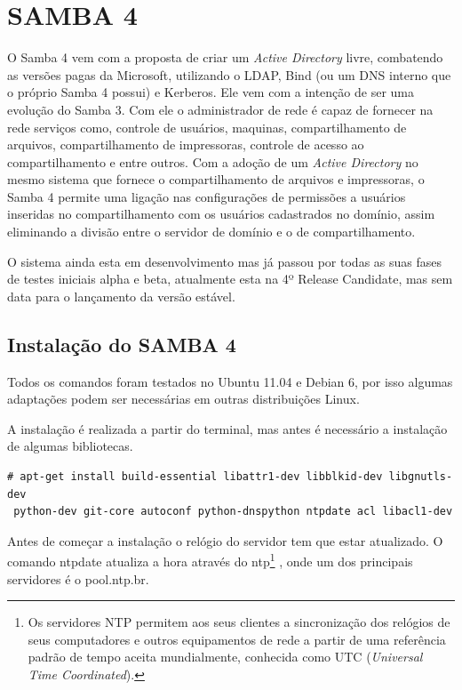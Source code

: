 \chapter{SAMBA 4}

O Samba 4 vem com a proposta de criar um \textit{Active Directory} livre, combatendo as versões pagas da Microsoft, utilizando o LDAP, Bind (ou um DNS interno que o próprio Samba 4 possui) e Kerberos. Ele vem com a intenção de ser uma evolução do Samba 3. Com ele o administrador de rede é capaz de fornecer na rede serviços como, controle de usuários, maquinas, compartilhamento de arquivos, compartilhamento de impressoras, controle de acesso ao compartilhamento e entre outros.
Com a adoção de um \textit{Active Directory} no mesmo sistema que fornece o compartilhamento de arquivos e impressoras, o Samba 4 permite uma ligação nas configurações de permissões a usuários inseridas no compartilhamento com os usuários cadastrados no domínio, assim eliminando a divisão entre o servidor de domínio e o de compartilhamento.

O sistema ainda esta em desenvolvimento mas já passou por todas as suas fases de testes iniciais alpha e beta, atualmente esta na 4º Release Candidate, mas sem data para o lançamento da versão estável.

\section{Instalação do SAMBA 4}

Todos os comandos foram testados no Ubuntu 11.04 e Debian 6, por isso algumas adaptações podem ser necessárias em outras distribuições Linux.

A instalação é realizada a partir do terminal, mas antes é necessário a instalação de algumas bibliotecas.\\

\begin{lstlisting}
# apt-get install build-essential libattr1-dev libblkid-dev libgnutls-dev
 python-dev git-core autoconf python-dnspython ntpdate acl libacl1-dev
\end{lstlisting}

Antes de começar a instalação o relógio do servidor tem que estar atualizado. O comando ntpdate atualiza a hora através do  ntp\footnote[2]{Os servidores NTP permitem aos seus clientes a sincronização dos relógios de seus computadores e outros equipamentos de rede a partir de uma referência padrão de tempo aceita mundialmente, conhecida como UTC (\textit{Universal Time Coordinated}).\cite{RNP}} , onde um dos principais servidores é o pool.ntp.br.\\

